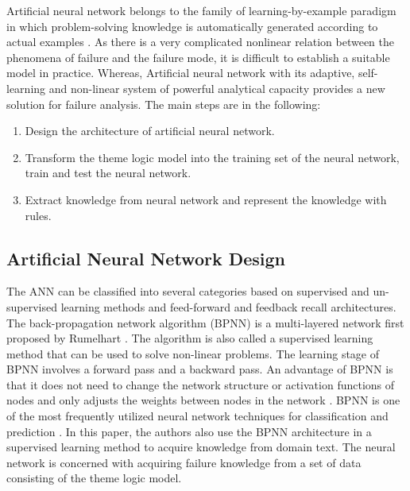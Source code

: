 \documentclass{elsart}
\begin{document}
Artificial neural network belongs to the family of learning-by-example
paradigm in which problem-solving knowledge is automatically generated
according to actual examples \cite{hassoun1995fan}. As there is a very
complicated nonlinear relation between the phenomena of failure and
the failure mode, it is difficult to establish a suitable model in
practice. Whereas, Artificial neural network with its adaptive, self-learning
and non-linear system of powerful analytical capacity provides a new
solution for failure analysis. The main steps are in the following:
\begin{enumerate}
\item Design the architecture of artificial neural network.
\item Transform the theme logic model into the training set of the
  neural network, train and test the neural network. 
\item  Extract knowledge from neural network and represent the
knowledge with rules.
\end{enumerate}


\subsection{Artificial Neural Network Design}
\label{sec:artif-neur-netw}

The ANN can be classified into several categories based on supervised
and un-supervised learning methods and feed-forward and feedback
recall architectures. The back-propagation network algorithm (BPNN) is
a multi-layered network first proposed by Rumelhart
\cite{rumelhart1986lir}. The algorithm is also called a supervised
learning method that can be used to solve non-linear problems. The
learning stage of BPNN involves a forward pass and a backward pass. An
advantage of BPNN is that it does not need to change the network
structure or activation functions of nodes and only adjusts the
weights between nodes in the network \cite{Massey2003}. BPNN is one of the most
frequently utilized neural network techniques for classification and
prediction \cite{graupe2007pan}. In this paper, the authors also use the
BPNN architecture in a supervised learning method to acquire knowledge
from domain text. The neural network is concerned with acquiring
failure knowledge from a set of data consisting of the theme logic
model. 
\end{document}
